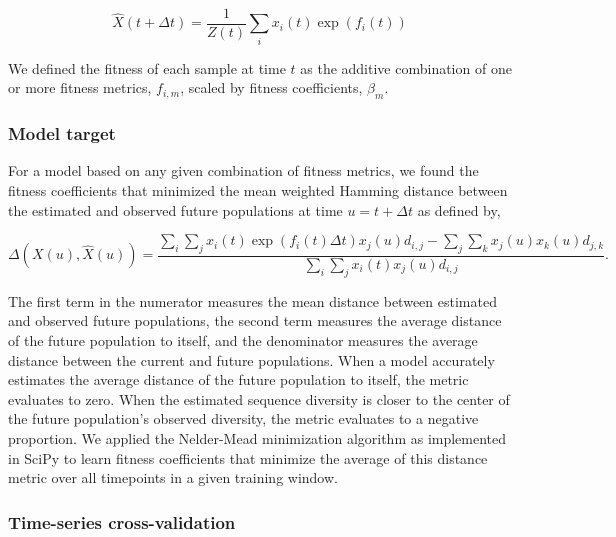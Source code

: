 $$
\hat{X}(t + \Delta{t}) = \frac{1}{Z(t)}\sum_{i}x_{i}(t)\exp(f_{i}(t))
$$

We defined the fitness of each sample at time $t$ as the additive combination of one or more fitness metrics, $f_{i,m}$, scaled by fitness coefficients, $\beta_{m}$.

\subsubsection*{Model target}

For a model based on any given combination of fitness metrics, we found the fitness coefficients that minimized the mean weighted Hamming distance between the estimated and observed future populations at time $u = t + \Delta{t}$ as defined by,

$$
\Delta(X(u), \hat{X}(u)) = \frac{\sum_{i}\sum_{j}x_{i}(t)\exp(f_{i}(t)\Delta{t})x_{j}(u)d_{i,j} - \sum_{j}\sum_{k}x_{j}(u)x_{k}(u)d_{j,k}}{\sum_{i}\sum_{j}x_{i}(t)x_{j}(u)d_{i,j}}.
$$

The first term in the numerator measures the mean distance between estimated and observed future populations, the second term measures the average distance of the future population to itself, and the denominator measures the average distance between the current and future populations.
When a model accurately estimates the average distance of the future population to itself, the metric evaluates to zero.
When the estimated sequence diversity is closer to the center of the future population's observed diversity, the metric evaluates to a negative proportion.
We applied the Nelder-Mead minimization algorithm as implemented in SciPy \cite{SciPy} to learn fitness coefficients that minimize the average of this distance metric over all timepoints in a given training window.

\subsubsection*{Time-series cross-validation}

